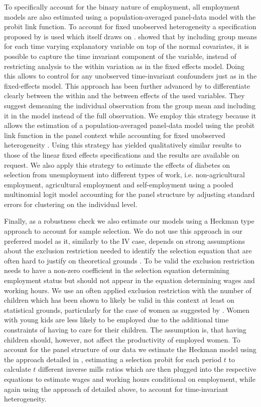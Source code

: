 To specifically account for the binary nature of employment, all employment
models are also estimated using a population-averaged panel-data model
with the probit link function. To account for fixed unobserved heterogeneity
a specification proposed by \citet{Bell2015} is used which itself
draws on \citet{Mundlak1978}. \citet{Mundlak1978} showed that by
including group means for each time varying explanatory variable on
top of the normal covariates, it is possible to capture the time invariant
component of the variable, instead of restricting analysis to the
within variation as in the fixed effects model. Doing this allows
to control for any unobserved time-invariant confounders just as in
the fixed-effects model. This approach has been further advanced by
\citet{Bell2015} to differentiate clearly between the within and
the between effects of the used variables. They suggest demeaning
the individual observation from the group mean and including it in
the model instead of the full observation. We employ this strategy
because it allows the estimation of a population-averaged panel-data
model using the probit link function in the panel context while accounting
for fixed unobserved heterogeneity \citep{Dieleman2014}. Using this
strategy has yielded qualitatively similar results to those of the
linear fixed effects specifications and the results are available
on request. We also apply this strategy to estimate the effects of diabetes on selection from unemployment into different types of work, i.e. non-agricultural employment, agricultural employment and self-employment using a pooled multinomial logit model accounting for the panel structure by adjusting standard errors for clustering on the individual level.

Finally, as a robustness check we also estimate our models using a Heckman type approach to account for sample selection. We do not use this approach in our preferred model as it, similarly to the \ac{IV} case, depends on strong assumptions about the exclusion restriction needed to identify the selection equation that are often hard to justify on theoretical grounds \citep{Huber_2013}. To be valid the exclusion restriction needs to have a non-zero coefficient in the selection equation determining employment status but should not appear in the equation determining wages and working hours. We use an often applied exclusion restriction with the number of children which has been shown to likely be valid in this context at least on statistical grounds, particularly for the case of women as suggested by \citet{Huber_2013}. Women with young kids are less likely to be employed due to the additional time constraints of having to care for their children. The assumption is, that having children should, however, not affect the productivity of employed women. To account for the panel structure of our data we estimate the Heckman model using the approach detailed in \citet{Wooldridge2002a}, estimating a selection probit for each period $t$ to calculate $t$ different inverse mills ratios which are then plugged into the respective equations to estimate wages and working hours conditional on employment, while again using the approach of \citet{Bell2015} detailed above, to account for time-invariant heterogeneity.



